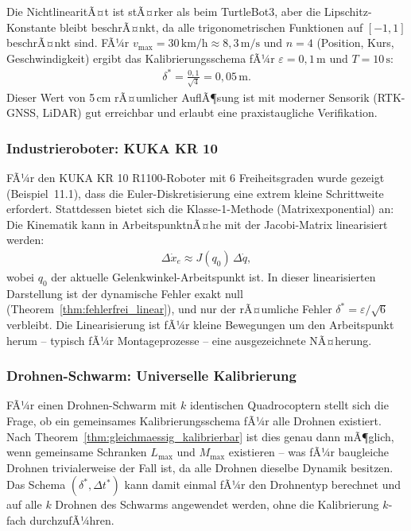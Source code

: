 ﻿\documentclass[a4paper,12pt]{article}
\theoremstyle{definition}
\begin{document}
Die NichtlinearitÃ¤t ist stÃ¤rker als beim TurtleBot3, aber die Lipschitz-Konstante bleibt beschrÃ¤nkt, da alle trigonometrischen Funktionen auf $[-1, 1]$ beschrÃ¤nkt sind. FÃ¼r $v_{\max} = 30\,\text{km/h} \approx 8{,}3\,\text{m/s}$ und $n = 4$ (Position, Kurs, Geschwindigkeit) ergibt das Kalibrierungsschema fÃ¼r $\varepsilon = 0{,}1\,\text{m}$ und $T = 10\,\text{s}$:
\begin{align}
  \delta^* = \frac{0{,}1}{\sqrt{4}} = 0{,}05\,\text{m}.
\end{align}
Dieser Wert von 5\,cm rÃ¤umlicher AuflÃ¶sung ist mit moderner Sensorik (RTK-GNSS, LiDAR) gut erreichbar und erlaubt eine praxistaugliche Verifikation.

\subsubsection{Industrieroboter: KUKA KR 10}

FÃ¼r den KUKA KR 10 R1100-Roboter mit 6 Freiheitsgraden wurde gezeigt (Beispiel~11.1), dass die Euler-Diskretisierung eine extrem kleine Schrittweite erfordert. Stattdessen bietet sich die Klasse-1-Methode (Matrixexponential) an: Die Kinematik kann in ArbeitspunktnÃ¤he mit der Jacobi-Matrix linearisiert werden:
\begin{align}
  \Delta\dot{x}_e \approx J(q_0)\,\Delta\dot{q},
\end{align}
wobei $q_0$ der aktuelle Gelenkwinkel-Arbeitspunkt ist. In dieser linearisierten Darstellung ist der dynamische Fehler exakt null (Theorem~\ref{thm:fehlerfrei_linear}), und nur der rÃ¤umliche Fehler $\delta^* = \varepsilon/\sqrt{6}$ verbleibt. Die Linearisierung ist fÃ¼r kleine Bewegungen um den Arbeitspunkt herum -- typisch fÃ¼r Montageprozesse -- eine ausgezeichnete NÃ¤herung.

\subsubsection{Drohnen-Schwarm: Universelle Kalibrierung}

FÃ¼r einen Drohnen-Schwarm mit $k$ identischen Quadrocoptern stellt sich die Frage, ob ein gemeinsames Kalibrierungsschema fÃ¼r alle Drohnen existiert. Nach Theorem~\ref{thm:gleichmaessig_kalibrierbar} ist dies genau dann mÃ¶glich, wenn gemeinsame Schranken $L_{\max}$ und $M_{\max}$ existieren -- was fÃ¼r baugleiche Drohnen trivialerweise der Fall ist, da alle Drohnen dieselbe Dynamik besitzen. Das Schema $(\delta^*, \Delta t^*)$ kann damit einmal fÃ¼r den Drohnentyp berechnet und auf alle $k$ Drohnen des Schwarms angewendet werden, ohne die Kalibrierung $k$-fach durchzufÃ¼hren.
\end{document}
